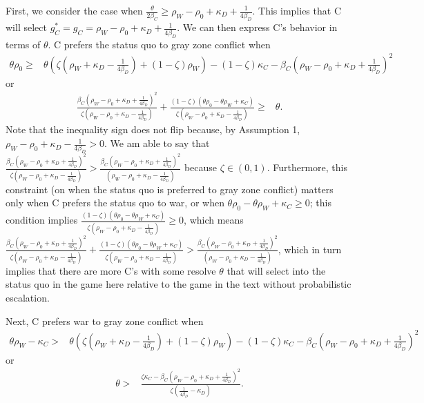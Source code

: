\documentclass[
]{article}
\begin{document}
First, we consider the case when \(\frac{\theta}{2\beta_{C}}\geq\rho_{W}-\rho_{0}+\kappa_{D}+\frac{1}{4\beta_{D}}\). This implies that C will select \(g_{C}^{*}=\hat{g_{C}}=\rho_{W}-\rho_{0}+\kappa_{D}+\frac{1}{4\beta_{D}}\). We can then express C's behavior in terms of \(\theta\). C prefers the status quo to gray zone conflict when
\begin{align*}
  \theta\rho_{0}\geq & \theta\left(\zeta\left(\rho_{W}+\kappa_{D}-\frac{1}{4\beta_{D}}\right)+(1-\zeta)\rho_{W}\right)-(1-\zeta)\kappa_{C}-\beta_{C}\left(\rho_{W}-\rho_{0}+\kappa_{D}+\frac{1}{4\beta_{D}}\right)^{2}
  \end{align*}
or
\begin{align*}
  \frac{\beta_{C}\left(\rho_{W}-\rho_{0}+\kappa_{D}+\frac{1}{4\beta_{D}}\right)^{2}}{\zeta\left(\rho_{W}-\rho_{0}+\kappa_{D}-\frac{1}{4\beta_{D}}\right)}+\frac{(1-\zeta)(\theta\rho_{0}-\theta\rho_{W}+\kappa_{C})}{\zeta\left(\rho_{W}-\rho_{0}+\kappa_{D}-\frac{1}{4\beta_{D}}\right)}\geq & \theta.
  \end{align*}
Note that the inequality sign does not flip because, by Assumption 1, \(\rho_{W}-\rho_{0}+\kappa_{D}-\frac{1}{4\beta_{D}}>0\). We am able to say that \(\frac{\beta_{C}\left(\rho_{W}-\rho_{0}+\kappa_{D}+\frac{1}{4\beta_{D}}\right)^{2}}{\zeta\left(\rho_{W}-\rho_{0}+\kappa_{D}-\frac{1}{4\beta_{D}}\right)}>\frac{\beta_{C}\left(\rho_{W}-\rho_{0}+\kappa_{D}+\frac{1}{4\beta_{D}}\right)^{2}}{\left(\rho_{W}-\rho_{0}+\kappa_{D}-\frac{1}{4\beta_{D}}\right)}\) because \(\zeta\in(0,1)\). Furthermore, this constraint (on when the status quo is preferred to gray zone conflict) matters only when C prefers the status quo to war, or when \(\theta\rho_{0}-\theta\rho_{W}+\kappa_{C}\geq0\); this condition implies \(\frac{(1-\zeta)(\theta\rho_{0}-\theta\rho_{W}+\kappa_{C})}{\zeta\left(\rho_{W}-\rho_{0}+\kappa_{D}-\frac{1}{4\beta_{D}}\right)}\geq0\), which means \(\frac{\beta_{C}\left(\rho_{W}-\rho_{0}+\kappa_{D}+\frac{1}{4\beta_{D}}\right)^{2}}{\zeta\left(\rho_{W}-\rho_{0}+\kappa_{D}-\frac{1}{4\beta_{D}}\right)}+\frac{(1-\zeta)(\theta\rho_{0}-\theta\rho_{W}+\kappa_{C})}{\zeta\left(\rho_{W}-\rho_{0}+\kappa_{D}-\frac{1}{4\beta_{D}}\right)}>\frac{\beta_{C}\left(\rho_{W}-\rho_{0}+\kappa_{D}+\frac{1}{4\beta_{D}}\right)^{2}}{\left(\rho_{W}-\rho_{0}+\kappa_{D}-\frac{1}{4\beta_{D}}\right)}\), which in turn implies that there are more C's with some resolve \(\theta\) that will select into the status quo in the game here relative to the game in the text without probabilistic escalation.

Next, C prefers war to gray zone conflict when
\begin{align*}
  \theta\rho_{W}-\kappa_{C}> & \theta\left(\zeta\left(\rho_{W}+\kappa_{D}-\frac{1}{4\beta_{D}}\right)+(1-\zeta)\rho_{W}\right)-(1-\zeta)\kappa_{C}-\beta_{C}\left(\rho_{W}-\rho_{0}+\kappa_{D}+\frac{1}{4\beta_{D}}\right)^{2}
  \end{align*}
or
\begin{align*}
  \theta> & \frac{\zeta\kappa_{C}-\beta_{C}\left(\rho_{W}-\rho_{0}+\kappa_{D}+\frac{1}{4\beta_{D}}\right)^{2}}{\zeta\left(\frac{1}{4\beta_{D}}-\kappa_{D}\right)}.
  \end{align*}
\end{document}
